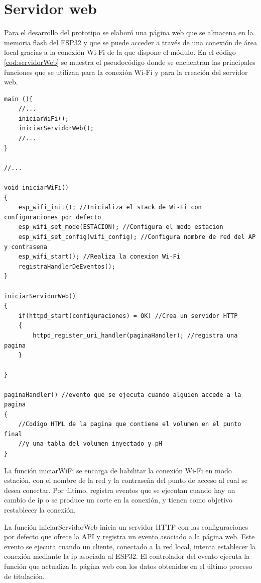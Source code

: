 \section{Servidor web}

Para el desarrollo del prototipo se elaboró una página web que se almacena en la memoria flash del ESP32 y que se puede acceder a través de una conexión de área local gracias a la conexión Wi-Fi de la que dispone el módulo. En el código \ref{cod:servidorWeb} se muestra el pseudocódigo donde se encuentran las principales funciones que se utilizan para la conexión Wi-Fi y para la creación del servidor web.

\begin{lstlisting}[label=cod:servidorWeb,caption=Pseudocódigo del servidor web.]
main (){
	//...
	iniciarWiFi();
	iniciarServidorWeb();
	//...
}

//...

void iniciarWiFi()
{
	esp_wifi_init(); //Inicializa el stack de Wi-Fi con configuraciones por defecto
	esp_wifi_set_mode(ESTACION); //Configura el modo estacion
	esp_wifi_set_config(wifi_config); //Configura nombre de red del AP y contrasena
	esp_wifi_start(); //Realiza la conexion Wi-Fi
	registraHandlerDeEventos();
}

iniciarServidorWeb()
{
	if(httpd_start(configuraciones) = OK) //Crea un servidor HTTP
	{
		httpd_register_uri_handler(paginaHandler); //registra una pagina
	}
	
}

paginaHandler() //evento que se ejecuta cuando alguien accede a la pagina
{
	//Codigo HTML de la pagina que contiene el volumen en el punto final
	//y una tabla del volumen inyectado y pH
}

\end{lstlisting}

La función iniciarWiFi se encarga de habilitar la conexión Wi-Fi en modo estación, con el nombre de la red y la contraseña del punto de acceso al cual se desea conectar. Por último, registra eventos que se ejecutan cuando hay un cambio de ip o se produce un corte en la conexión, y tienen como objetivo restablecer la conexión.

La función iniciarServidorWeb inicia un servidor HTTP con las configuraciones por defecto que ofrece la API y registra un evento asociado a la página web. Este evento se ejecuta cuando un cliente, conectado a la red local, intenta establecer la conexión mediante la ip asociada al ESP32. El controlador del evento ejecuta la función que actualiza la página web con los datos obtenidos en el último proceso de titulación.

